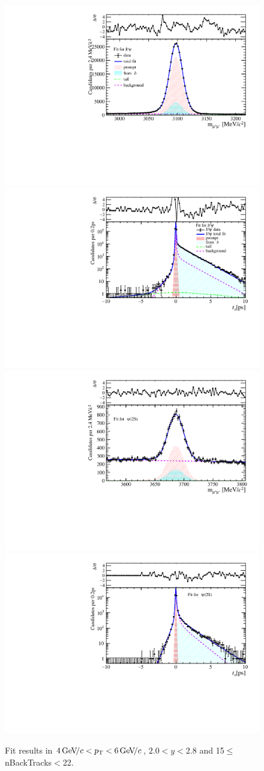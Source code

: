 \begin{figure}[H]
\begin{center}
\includegraphics[width=0.47\linewidth]{pdf/Jpsi/drawmassB/n3y1pt3.pdf}
\includegraphics[width=0.47\linewidth]{pdf/Jpsi/2DFitB/n3y1pt3.pdf}
\vspace*{-0.5cm}
\includegraphics[width=0.47\linewidth]{pdf/Psi2S/drawmassB/n3y1pt3.pdf}
\includegraphics[width=0.47\linewidth]{pdf/Psi2S/2DFitB/n3y1pt3.pdf}
\vspace*{-0.5cm}
\end{center}
\caption{Fit results in $4\text{\,Ge\kern -0.1em V\!/}c<p_{\mathrm{T}}<6\text{\,Ge\kern -0.1em V\!/}c$, $2.0<y<2.8$ and 15$\leq$nBackTracks$<$22.}
\label{Fitn3y1pt3}
\end{figure}
